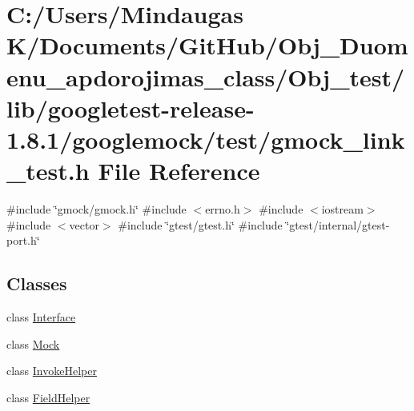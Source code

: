 \hypertarget{_obj__test_2lib_2googletest-release-1_88_81_2googlemock_2test_2gmock__link__test_8h}{}\section{C\+:/\+Users/\+Mindaugas K/\+Documents/\+Git\+Hub/\+Obj\+\_\+\+Duomenu\+\_\+apdorojimas\+\_\+class/\+Obj\+\_\+test/lib/googletest-\/release-\/1.8.1/googlemock/test/gmock\+\_\+link\+\_\+test.h File Reference}
\label{_obj__test_2lib_2googletest-release-1_88_81_2googlemock_2test_2gmock__link__test_8h}
{\ttfamily \#include \char`\"{}gmock/gmock.\+h\char`\"{}}\newline
{\ttfamily \#include $<$errno.\+h$>$}\newline
{\ttfamily \#include $<$iostream$>$}\newline
{\ttfamily \#include $<$vector$>$}\newline
{\ttfamily \#include \char`\"{}gtest/gtest.\+h\char`\"{}}\newline
{\ttfamily \#include \char`\"{}gtest/internal/gtest-\/port.\+h\char`\"{}}\newline
\subsection*{Classes}
\begin{DoxyCompactItemize}
\item 
class \mbox{\hyperlink{class_interface}{Interface}}
\item 
class \mbox{\hyperlink{class_mock}{Mock}}
\item 
class \mbox{\hyperlink{class_invoke_helper}{Invoke\+Helper}}
\item 
class \mbox{\hyperlink{class_field_helper}{Field\+Helper}}
\end{DoxyCompactItemize}

